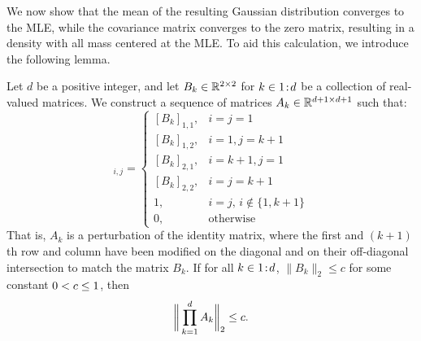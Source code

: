 We now show that the mean of the resulting Gaussian distribution converges to the MLE, while the covariance matrix converges to the zero matrix, resulting in a density with all mass centered at the MLE. 
To aid this calculation, we introduce the following lemma.
\begin{lemma}\label{lemma:bound}
\label{lemma:matrix}
  Let $d$ be a positive integer, and let $B_k \in \mathbb{R}^{2\times 2}$ for $k \in {1}\!:\!{d}$ be a collection of real-valued matrices.
  We construct a sequence of matrices $A_{k} \in \mathbb{R}^{d+1\times d+1}$ such that:
  \begin{equation*}
    [A_k]_{i, j} = \begin{cases}
        [B_k]_{1,1}, & i = j = 1 \\ 
        [B_k]_{1,2}, & i = 1, j = k+1 \\
        [B_k]_{2, 1}, & i = k+1, j=1 \\
        [B_k]_{2,2}, & i = j = k+1 \\
        1, & i = j, \, i \notin \{1, k+1\} \\
        0, & \text{otherwise}
	\end{cases}
  \end{equation*}
 That is, $A_k$ is a perturbation of the identity matrix, where the first and $(k+1)$th row and column have been modified on the diagonal and on their off-diagonal intersection to match the matrix $B_k$.
If for all $k \in {1}\!:\!{d}$, $\|B_k\|_2 \leq c$ for some constant $0 < c \leq 1$, then
\begin{equation}\label{eq:lemma:bound}
\bigg\| \prod_{k = 1}^d A_k \bigg\|_2 \leq c.
\end{equation}
\end{lemma}
